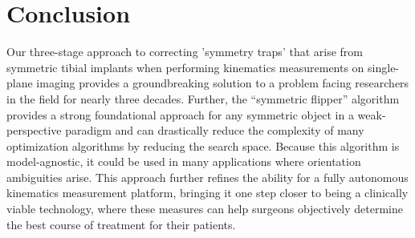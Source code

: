 \section{Conclusion}
Our three-stage approach to correcting 'symmetry traps' that arise from symmetric tibial implants when performing kinematics measurements on single-plane imaging provides a groundbreaking solution to a problem facing researchers in the field for nearly three decades.
Further, the “symmetric flipper” algorithm provides a strong foundational approach for any symmetric object in a weak-perspective paradigm and can drastically reduce the complexity of many optimization algorithms by reducing the search space.
Because this algorithm is model-agnostic, it could be used in many applications where orientation ambiguities arise.
This approach further refines the ability for a fully autonomous kinematics measurement platform, bringing it one step closer to being a clinically viable technology, where these measures can help surgeons objectively determine the best course of treatment for their patients.



